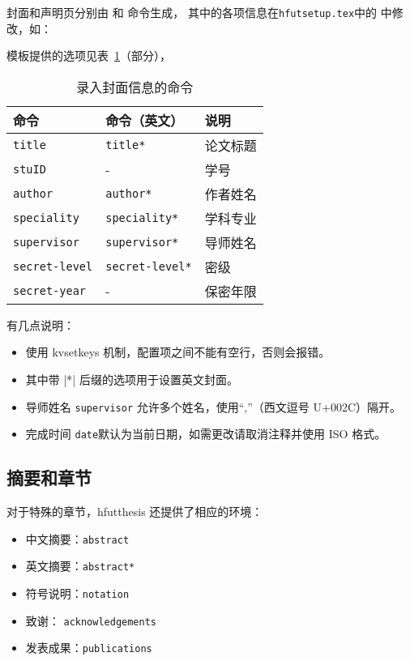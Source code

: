 \documentclass[a4paper]{ltxdoc}
\DeclareRobustCommand\file{\nolinkurl}
\DeclareRobustCommand\env{\texttt}
\DeclareRobustCommand\pkg{\textsf}
\DeclareRobustCommand\cls{\textsf}
\DeclareRobustCommand\opt{\texttt}
\begin{document}
\DescribeMacro{\maketitle}
\DescribeMacro{\copyrightpage}
封面和声明页分别由  和  命令生成，
其中的各项信息在\file{hfutsetup.tex}中的 中修改，如：
\begin{latex}
\end{latex}
模板提供的选项见表~\ref{tab:covercmds}（部分），
\begin{table}[htb]
  \centering\small
  \caption{录入封面信息的命令}
  \label{tab:covercmds}
  \begin{tabular}{lll}
    \toprule
    命令                & 命令（英文）         & 说明       \\
    \midrule
    \opt{title}         & \opt{title*}         & 论文标题   \\
    \opt{stuID}         & -                    & 学号   \\
    \opt{author}        & \opt{author*}        & 作者姓名   \\
    \opt{speciality}    & \opt{speciality*}    & 学科专业   \\
    \opt{supervisor}    & \opt{supervisor*}    & 导师姓名   \\
    \opt{secret-level}  & \opt{secret-level*}  & 密级       \\
    \opt{secret-year}   & -                    & 保密年限   \\
    \bottomrule
  \end{tabular}
\end{table}

有几点说明：
\begin{itemize}
  \item {} 使用 \pkg{kvsetkeys} 机制，配置项之间不能有空行，否则会报错。
  \item 其中带 |*| 后缀的选项用于设置英文封面。
  \item 导师姓名 \opt{supervisor} 允许多个姓名，使用“,”（西文逗号 U+002C）隔开。
  \item 完成时间 \opt{date}默认为当前日期，如需更改请取消注释并使用 ISO 格式。
\end{itemize}


\subsection{摘要和章节}
对于特殊的章节，\cls{hfutthesis} 还提供了相应的环境：
\begin{itemize}
  \item 中文摘要：\env{abstract}
  \item 英文摘要：\env{abstract*}
  \item 符号说明：\env{notation}
  \item 致谢：    \env{acknowledgements}
  \item 发表成果：\env{publications}
\end{itemize}
\end{document}
